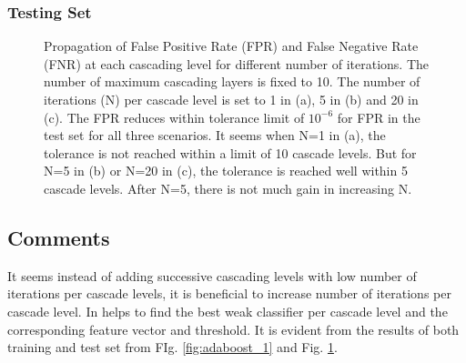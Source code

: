 \documentclass{article}
\begin{document}
\subsubsection{Testing Set}
\begin{figure}[!htbp]
     \centering
     \captionsetup[subfigure]{labelformat=empty}
    \caption{Propagation of False Positive Rate (FPR) and False Negative Rate (FNR) at each cascading level for different number of iterations. The number of maximum cascading layers is fixed to 10. The number of iterations (N) per cascade level is set to 1 in (a), 5 in (b) and 20 in (c). The FPR reduces within tolerance limit of $10^{-6}$ for FPR in the test set for all three scenarios. It seems when N=1 in (a), the tolerance is not reached within a limit of 10 cascade levels. But for N=5 in (b) or N=20 in (c), the tolerance is reached well within 5 cascade levels. After N=5, there is not much gain in increasing N.}
    \label{fig:adaboost_2}
\end{figure}
\subsection{Comments}
It seems instead of adding successive cascading levels with low number of iterations per cascade levels, it is beneficial to increase number of iterations per cascade level. In helps to find the best weak classifier per cascade level and the corresponding feature vector and threshold. It is evident from the results of both training and test set from FIg. \ref{fig:adaboost_1} and Fig. \ref{fig:adaboost_2}.
\end{document}
